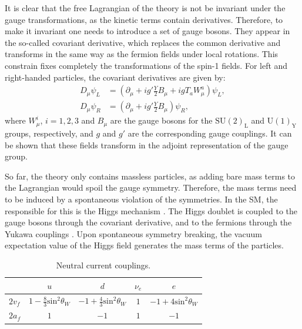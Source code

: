It is clear that the free Lagrangian of the theory is not be invariant under the gauge transformations, as the kinetic terms contain derivatives. Therefore, to make it invariant one needs to introduce a set of gauge bosons. They appear in the so-called covariant derivative, which replaces the common derivative and transforms in the same way as the fermion fields under local rotations. This constrain fixes completely the transformations of the spin-1 fields. For left and right-handed particles, the covariant derivatives are given by:
\begin{equation}
	\begin{split}
		D_{\mu} \psi_{L} &= \left(\partial_{\mu} + ig'\frac{Y}{2}B_{\mu}+igT_{a}W^{a}_{\mu}\right)\psi_{L},\\
		D_{\mu} \psi_{R} &= \left(\partial_{\mu} + ig'\frac{Y}{2}B_{\mu}\right)\psi_{R},
	\end{split}
\end{equation}
where $W^{i}_{\mu}$, $i=1,2,3$ and $B_{\mu}$ are the gauge bosons for the $\mathrm{SU}(2)_{\mathrm{L}}$ and $\mathrm{U}(1)_{\mathrm{Y}}$ groups, respectively, and $g$ and $g'$ are the corresponding gauge couplings. It can be shown that these fields transform in the adjoint representation of the gauge group.

So far, the theory only contains massless particles, as adding bare mass terms to the Lagrangian would spoil the gauge symmetry. Therefore, the mass terms need to be induced by a spontaneous violation of the symmetries. In the SM, the responsible for this is the Higgs mechanism \cite{Englert1964,Higgs1964,Guralnik1964}. The Higgs doublet is coupled to the gauge bosons through the covariant derivative, and to the fermions through the Yukawa couplings \cite{Pich2012}. Upon spontaneous symmetry breaking, the vacuum expectation value of the Higgs field generates the mass terms of the particles.

\begin{table}[t]
	\centering
	\caption{Neutral current couplings.}
			\begin{tabular}{l|cccc}
					& $u$                                       & $d$                                        & $\nu_{e}$ & $e$                              \\[2mm] \hline
			\rule{0pt}{1.1\normalbaselineskip}$2v_{f}$ & $1-\frac{8}{3}\mathrm{sin}^{2}\theta_{W}$ & $-1+\frac{4}{3}\mathrm{sin}^{2}\theta_{W}$ & $1$       & $-1+4\mathrm{sin}^{2}\theta_{W}$ \\[2mm]
			$2a_{f}$ & $1$                                       & $-1$                                       & $1$       & $-1$                            
		\end{tabular}
	\label{tab:sm_nc_couplings}
\end{table}

